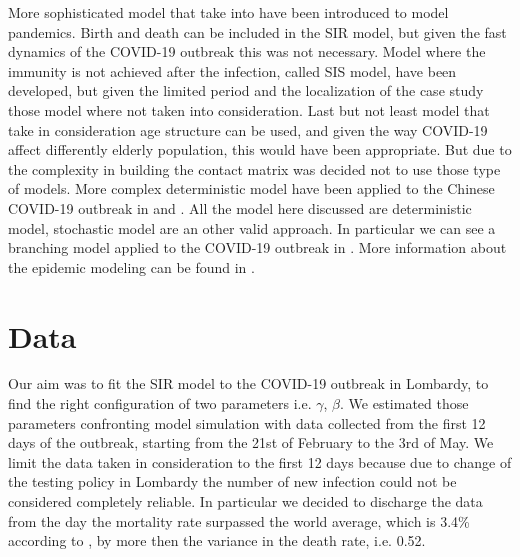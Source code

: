 \documentclass[]{article}
\begin{document}
More sophisticated model that take into have been introduced to model pandemics. Birth and death can be included in the SIR model, but given the fast dynamics of the COVID-19 outbreak this was not necessary. Model where the immunity is not achieved after the infection, called SIS model, have been developed, but given the limited period and the localization of the case study those model where not taken into consideration. Last but not least model that take in consideration age structure can be used, and given the way COVID-19 affect differently elderly population, this would have been appropriate. But due to the complexity in building the contact matrix was decided not to use those type of models. More complex deterministic model have been applied to the Chinese COVID-19 outbreak in \cite{read2020novel} and \cite{tang2020estimation}. All the model here discussed are deterministic model, stochastic model are an other valid approach. In particular we can see a branching model applied to the COVID-19 outbreak in \cite{hellewell2020}.
More information about the epidemic modeling can be found in \cite{keeling2011modeling}.
\section{Data}\label{sec:data}
Our aim was to fit the SIR model to the COVID-19 outbreak in Lombardy, to find the right configuration of two parameters i.e. $\gamma$, $\beta$. We estimated those parameters confronting model simulation with data collected from the first 12 days of the outbreak, starting from the 21st of February to the 3rd of May.
We limit the data taken in consideration to the first 12 days because due to change of the testing policy in Lombardy the number of new infection could not be considered completely reliable. In particular we decided to discharge the data from the day the mortality rate surpassed the world average, which is 3.4\% according to \cite{WHOpen}, by more then the variance in the death rate, i.e. 0.52.
\end{document}
